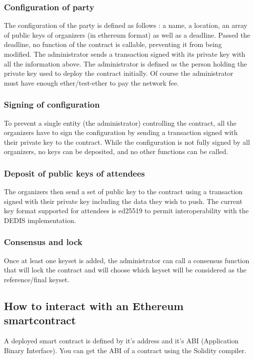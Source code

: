 \documentclass[11pt, a4paper, twoside, openright]{book} %
\begin{document}
\subsubsection{Configuration of party}
The configuration of the party is defined as follows : a name, a location, an array of public keys of organizers (in ethereum format) as well as a deadline. Passed the deadline, no function of the contract is callable, preventing it from being modified. The administrator sends a transaction signed with its private key with all the information above. The administrator is defined as the person holding the private key used to deploy the contract initially. Of course the administrator must have enough ether/test-ether to pay the network fee. 
\subsubsection{Signing of configuration}
 To prevent a single entity (the administrator) controlling the contract, all the organizers have to sign the configuration by sending a transaction signed with their private key to the contract. While the configuration is not fully signed by all organizers, no keys can be deposited, and no other functions can be called. 
\subsubsection{Deposit of public keys of attendees}  
 The organizers then send a set of public key to the contract using a transaction signed with their private key including the data they wish to push. The current key format supported for attendees is ed25519 to permit interoperability with the DEDIS implementation.
\subsubsection{Consensus and lock}
Once at least one keyset is added, the administrator can call a consensus function that will lock the contract and will choose which keyset will be considered as the reference/final keyset.


\subsection{How to interact with an Ethereum smartcontract}
A deployed smart contract is defined by it's address and it's ABI (Application Binary Interface). You can get the ABI of a contract using the Solidity compiler.
\end{document}
